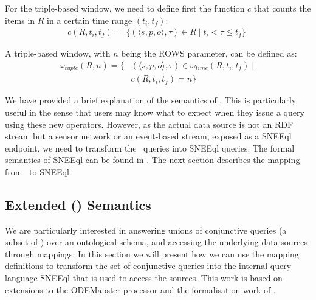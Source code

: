 
For the triple-based window, we need to define first the function $c$ that counts the items in $R$ in a certain time range $(t_{i},t_{f})$:
\begin{align*}
c(R,t_{i},t_{f})=|\{(\langle s,p,o \rangle,\tau) \in R \mid t_{i} < \tau \leq t_{f}\}|
\end{align*}

A triple-based window, with $n$ being the \textsf{ROWS} parameter, can be defined as:
\begin{align*}
\omega_{tuple}(R,n)=\{ & (\langle s,p,o \rangle,\tau) \in \omega_{time}(R,t_{i},t_{f}) \mid \\
& c(R,t_{i},t_{f})=n \}
\end{align*}

We have provided a brief explanation of the semantics of \sparqlstr. This is particularly useful in the sense that users may know what to expect when they issue a query using these new operators. However, as the actual data source is not an RDF stream but a sensor network or an event-based stream, exposed as a SNEEql endpoint, we need to transform the \sparqlstr\ queries into SNEEql queries. The formal semantics of SNEEql can be found in \cite{Brenninkmeijer_08}.
The next section describes the mapping from \sparqlstr\ to SNEEql.




\subsection{Extended \textbf{\rtwoo (\stwoo)} Semantics}
\label{mappingsemantics}

We are particularly interested in answering unions of conjunctive queries (a subset of \sparqlstr) over an ontological
schema, and accessing the underlying data sources \linebreak  through mappings. In this section we will present how we can use the
mapping definitions to transform the set of conjunctive queries into the internal query language SNEEql that is used to
access the sources. This work is based on extensions to the ODEMapster processor \cite{Barrasa_04} and the
formalisation work of \cite{Calvanese_05,Poggi_08}.

